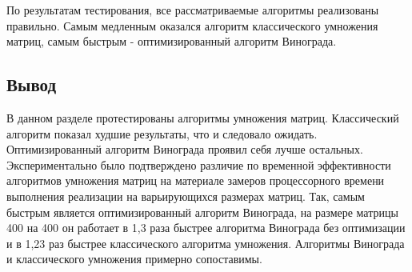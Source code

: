 По результатам тестирования, все рассматриваемые алгоритмы реализованы правильно. Самым медленным оказался алгоритм классического умножения матриц, самым быстрым - оптимизированный алгоритм Винограда.

\subsection{Вывод}
В данном разделе протестированы алгоритмы умножения матриц. Классический алгоритм показал худшие результаты, что и следовало ожидать. Оптимизированный алгоритм Винограда проявил себя лучше остальных. Экспериментально было подтверждено различие по временной эффективности алгоритмов умножения матриц на материале замеров процессорного времени выполнения реализации на варьирующихся размерах матриц. Так, самым быстрым является оптимизированный алгоритм Винограда, на размере матрицы 400 на 400 он работает в 1,3 раза быстрее алгоритма Винограда без оптимизации и в 1,23 раз быстрее классического алгоритма умножения. Алгоритмы Винограда и классического умножения примерно сопоставимы.